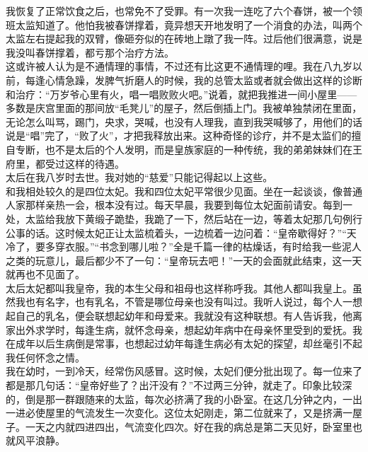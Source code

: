 我恢复了正常饮食之后，也常免不了受罪。有一次我一连吃了六个春饼，被一个领班太监知道了。他怕我被春饼撑着，竟异想天开地发明了一个消食的办法，叫两个太监左右提起我的双臂，像砸夯似的在砖地上蹾了我一阵。过后他们很满意，说是我没叫春饼撑着，都亏那个治疗方法。\\

这或许被人认为是不通情理的事情，不过还有比这更不通情理的哩。我在八九岁以前，每逢心情急躁，发脾气折磨人的时候，我的总管太监或者就会做出这样的诊断和治疗：“万岁爷心里有火，唱一唱败败火吧。”说着，就把我推进一间小屋里——多数是庆宫里面的那间放“毛凳儿”的屋子，然后倒插上门。我被单独禁闭在里面，无论怎么叫骂，踢门，央求，哭喊，也没有人理我，直到我哭喊够了，用他们的话说是“唱”完了，“败了火”，才把我释放出来。这种奇怪的诊疗，并不是太监们的擅自专断，也不是太后的个人发明，而是皇族家庭的一种传统，我的弟弟妹妹们在王府里，都受过这样的待遇。\\

太后在我八岁时去世。我对她的“慈爱”只能记得起以上这些。\\

和我相处较久的是四位太妃。我和四位太妃平常很少见面。坐在一起谈谈，像普通人家那样亲热一会，根本没有过。每天早晨，我要到每位太妃面前请安。每到一处，太监给我放下黄缎子跪垫，我跪了一下，然后站在一边，等着太妃那几句例行公事的话。这时候太妃正让太监梳着头，一边梳着一边问着：“皇帝歇得好？”“天冷了，要多穿衣服。”“书念到哪儿啦？”全是千篇一律的枯燥话，有时给我一些泥人之类的玩意儿，最后都少不了一句：“皇帝玩去吧！”一天的会面就此结束，这一天就再也不见面了。\\

太后太妃都叫我皇帝，我的本生父母和祖母也这样称呼我。其他人都叫我皇上。虽然我也有名字，也有乳名，不管是哪位母亲也没有叫过。我听人说过，每个人一想起自己的乳名，便会联想起幼年和母爱来。我就没有这种联想。有人告诉我，他离家出外求学时，每逢生病，就怀念母亲，想起幼年病中在母亲怀里受到的爱抚。我在成年以后生病倒是常事，也想起过幼年每逢生病必有太妃的探望，却丝毫引不起我任何怀念之情。\\

我在幼时，一到冷天，经常伤风感冒。这时候，太妃们便分批出现了。每一位来了都是那几句话：“皇帝好些了？出汗没有？”不过两三分钟，就走了。印象比较深的，倒是那一群跟随来的太监，每次必挤满了我的小卧室。在这几分钟之内，一出一进必使屋里的气流发生一次变化。这位太妃刚走，第二位就来了，又是挤满一屋子。一天之内就四进四出，气流变化四次。好在我的病总是第二天见好，卧室里也就风平浪静。\\

